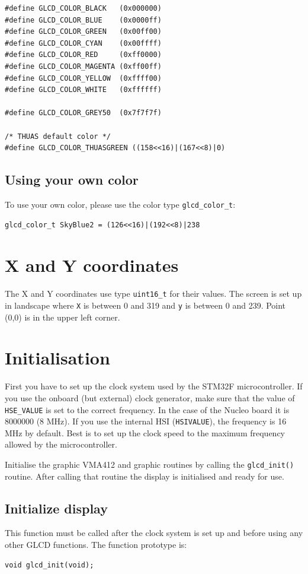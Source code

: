 \documentclass[12pt]{article}
\begin{document}
\begin{lstlisting}
#define GLCD_COLOR_BLACK   (0x000000)
#define GLCD_COLOR_BLUE    (0x0000ff)
#define GLCD_COLOR_GREEN   (0x00ff00)
#define GLCD_COLOR_CYAN    (0x00ffff)
#define GLCD_COLOR_RED     (0xff0000)
#define GLCD_COLOR_MAGENTA (0xff00ff)
#define GLCD_COLOR_YELLOW  (0xffff00)
#define GLCD_COLOR_WHITE   (0xffffff)

#define GLCD_COLOR_GREY50  (0x7f7f7f)

/* THUAS default color */
#define GLCD_COLOR_THUASGREEN ((158<<16)|(167<<8)|0)
\end{lstlisting}

\subsection{Using your own color}
To use your own color, please use the color type \lstinline|glcd_color_t|:

\begin{lstlisting}
glcd_color_t SkyBlue2 = (126<<16)|(192<<8)|238
\end{lstlisting}

\section{X and Y coordinates}
The X and Y coordinates use type \lstinline|uint16_t| for their values. The screen is set up in landscape where \lstinline|X| is between 0 and 319 and \lstinline|y| is between 0 and 239. Point (0,0) is in the upper left corner.



\section{Initialisation}
First you have to set up the clock system used by the STM32F microcontroller. If you use the onboard (but external) clock generator, make sure that the value of \lstinline|HSE_VALUE| is set to the correct frequency. In the case of the Nucleo board it is 8000000 (8 MHz). If you use the internal HSI (\lstinline|HSIVALUE|), the frequency is 16 MHz by default. Best is to set up the clock speed to the maximum frequency allowed by the microcontroller.

Initialise the graphic VMA412 and graphic routines by calling the \lstinline|glcd_init()| routine. After calling that routine the display is initialised and ready for use.

\subsection{Initialize display}
This function must be called after the clock system is set up and before using any other GLCD functions. The function prototype is:
\begin{lstlisting}
void glcd_init(void);
\end{lstlisting}
\end{document}
